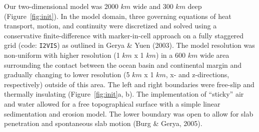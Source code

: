 \documentclass[draft,linenumbers]{agujournal2018}
\begin{document}
Our two-dimensional model was 2000 \(km\) wide and 300 \(km\) deep
(Figure~\ref{fig:init}). In the model domain, three governing equations
of heat transport, motion, and continuity were discretized and solved
using a conservative finite-difference with marker-in-cell approach on a
fully staggered grid (code: \texttt{I2VIS}) as outlined in Gerya \& Yuen
(2003). The model resolution was non-uniform with higher resolution (1
\(km\) x 1 \(km\)) in a 600 \(km\) wide area surrounding the contact
between the ocean basin and continental margin and gradually changing to
lower resolution (5 \(km\) x 1 \(km\), x- and z-directions,
respectively) outside of this area. The left and right boundaries were
free-slip and thermally insulating (Figure~\ref{fig:init}a, b). The
implementation of ``sticky'' air and water allowed for a free
topographical surface with a simple linear sedimentation and erosion
model. The lower boundary was open to allow for slab penetration and
spontaneous slab motion (Burg \& Gerya, 2005).
\end{document}
